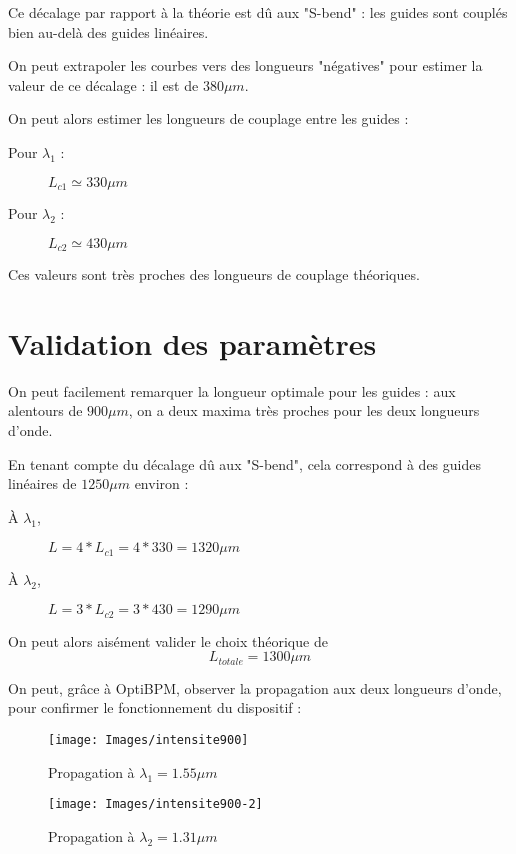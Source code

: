 \documentclass[a4paper,11pt]{report}
\begin{document}
Ce décalage par rapport à la théorie est dû aux "S-bend" : les guides sont couplés bien au-delà des guides linéaires.

On peut extrapoler les courbes vers des longueurs "négatives" pour estimer la valeur de ce décalage : il est de $380\mu m$.

On peut alors estimer les longueurs de couplage entre les guides :
\begin{description}
    \item[Pour $\lambda_1$ :] $L_{c1} \simeq 330\mu m$
    \item[Pour $\lambda_2$ :] $L_{c2} \simeq 430\mu m $
\end{description}

Ces valeurs sont très proches des longueurs de couplage théoriques.

\section{Validation des paramètres}
On peut facilement remarquer la longueur optimale pour les guides : aux alentours de $900\mu m$, on a deux maxima très proches pour les deux longueurs d'onde.

En tenant compte du décalage dû aux "S-bend", cela correspond à des guides linéaires de $1250\mu m$ environ :
\begin{description}
    \item[À $\lambda_1$,] $L = 4*L_{c1} = 4*330 = 1320\mu m$
    \item[À $\lambda_2$,] $L = 3*L_{c2} = 3*430 = 1290\mu m$
\end{description}

On peut alors aisément valider le choix théorique de
\[L_{totale} = 1300\mu m\]
\vspace*{2mm}

On peut, grâce à OptiBPM, observer la propagation aux deux longueurs d'onde, pour confirmer le fonctionnement du dispositif : 
\begin{figure}[h]
    \begin{center}
        \texttt{[image: Images/intensite900]}
        \caption{Propagation à $\lambda_1=1.55\mu m$}
        \vspace*{1cm}
        \texttt{[image: Images/intensite900-2]}
        \caption{Propagation à $\lambda_2=1.31\mu m$}
        \label{fig:}
    \end{center}
\end{figure}
\end{document}
